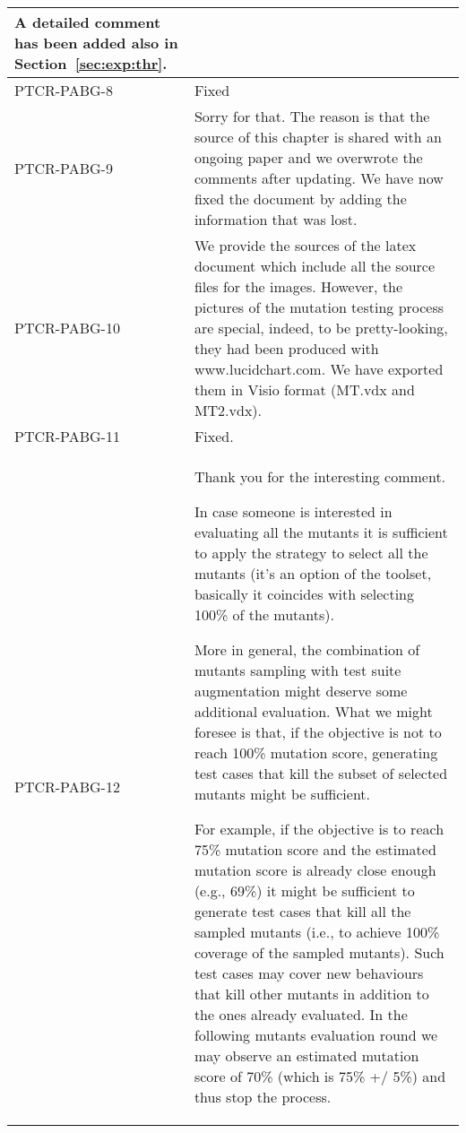 \begin{longtable}{|p{1.5cm}|p{12cm}|@{}}
\begin{minipage}{12cm}
A detailed comment has been added also in Section~\ref{sec:exp:thr}.
\end{minipage}\\
\hline
PTCR-PABG-8&
\begin{minipage}{12cm}
Fixed
\end{minipage}\\
\hline
PTCR-PABG-9&
\begin{minipage}{12cm}
Sorry for that. The reason is that the source of this chapter is shared with an ongoing paper and we overwrote the comments after updating. We have now fixed the document by adding the information that was lost.
\end{minipage}\\
\hline
PTCR-PABG-10&
\begin{minipage}{12cm}
We provide the sources of the latex document which include all the source files for the images.
However, the pictures of the mutation testing process are special, indeed, to be pretty-looking, they had been produced with www.lucidchart.com. We have exported them in Visio format (MT.vdx and MT2.vdx).
\end{minipage}\\
\hline
PTCR-PABG-11&
\begin{minipage}{12cm}
Fixed.
\end{minipage}\\
\hline
PTCR-PABG-12&
\begin{minipage}{12cm}

Thank you for the interesting comment.

In case someone is interested in evaluating all the mutants it is sufficient to apply the strategy to select all the mutants (it's an option of the toolset, basically it coincides with selecting 100\% of the mutants).

More in general, the combination of mutants sampling with test suite augmentation might deserve some additional evaluation. What we might foresee is that, if the objective is not to reach 100\% mutation score, generating test cases that kill the subset of selected mutants might be sufficient.

For example, if the objective is to reach 75\% mutation score and the estimated mutation score is already close enough (e.g., 69\%) it might be sufficient to generate test cases that kill all the sampled mutants (i.e., to achieve 100\% coverage of the sampled mutants). Such test cases may cover new behaviours that kill other mutants in addition to the ones already evaluated. In the following mutants evaluation round we may observe an estimated mutation score of 70\% (which is 75\% +/ 5\%) and thus stop the process.


\end{minipage}
\end{longtable}
